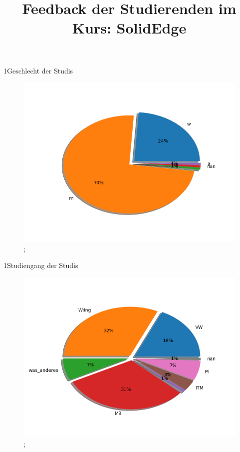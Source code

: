 \documentclass[10pt]{beamer}
\title{Feedback der Studierenden im Kurs: SolidEdge }
\begin{document}
 
     \maketitle 
\begin{frame}[fragile]{1Geschlecht der Studis} 
 \begin{figure}
 \includegraphics[width= 0.9\linewidth]{./PDFcreater/Plots/SolidEdge/1Geschlecht+der+Studis.png};
 \end{figure}
 \end{frame}
\begin{frame}[fragile]{1Studiengang der Studis} 
 \begin{figure}
 \includegraphics[width= 0.9\linewidth]{./PDFcreater/Plots/SolidEdge/1Studiengang+der+Studis.png};
 \end{figure}
 \end{frame}
\end{document}
